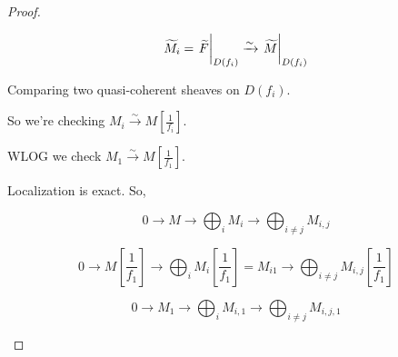 \documentclass{article}
\theoremstyle{definition}
\begin{document}
\begin{proof}
\begin{enumerate}[label=\arabic*)]
            \[
                \widetilde{M}_i = \eval{\widetilde{F}}_{D(f_i)} \xrightarrow{\sim} \eval{\widetilde{M}}_{D(f_i)}
            \]

            Comparing two quasi-coherent sheaves on \(D(f_i)\).

            So we're checking \(M_i \xrightarrow{\sim} M \left[ \frac{1}{f_i} \right]\).

            WLOG we check \(M_1 \xrightarrow{\sim} M \left[ \frac{1}{f_1} \right]\).

            Localization is exact. So,

            \[
                0 \to M \to \bigoplus_{i} M_i \to \bigoplus_{i\neq j} M_{i,j} 
            \]

            \[
                0 \to M\left[ \frac{1}{f_1} \right]  \to \bigoplus_{i} M_i \left[ \frac{1}{f_1} \right] = M_{i1} \to \bigoplus_{i\neq j} M_{i,j} \left[ \frac{1}{f_1} \right]   
            \]

            \[
                0 \to M_1 \to \bigoplus_{i} M_{i,1} \to \bigoplus_{i\neq j} M_{i,j,1}
            \]

        \end{enumerate} 
    \end{proof}
\end{document}
